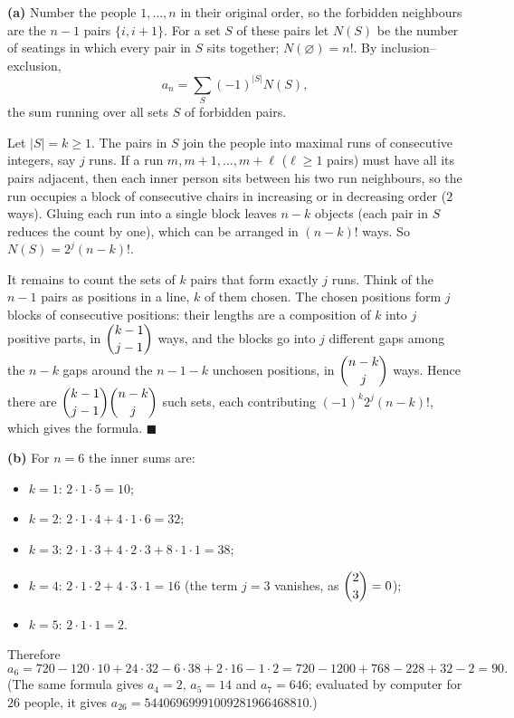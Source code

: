 \textbf{(a)} Number the people $1,\ldots,n$ in their original order, so the forbidden neighbours are the $n-1$ pairs $\{i,i+1\}$. For a set $S$ of these pairs let $N(S)$ be the number of seatings in which every pair in $S$ sits together; $N(\varnothing)=n!$. By inclusion--exclusion,
\[a_n=\sum_S(-1)^{|S|}N(S),\]
the sum running over all sets $S$ of forbidden pairs.

Let $|S|=k\ge1$. The pairs in $S$ join the people into maximal runs of consecutive integers, say $j$ runs. If a run $m,m+1,\ldots,m+\ell$ ($\ell\ge1$ pairs) must have all its pairs adjacent, then each inner person sits between his two run neighbours, so the run occupies a block of consecutive chairs in increasing or in decreasing order ($2$ ways). Gluing each run into a single block leaves $n-k$ objects (each pair in $S$ reduces the count by one), which can be arranged in $(n-k)!$ ways. So $N(S)=2^j(n-k)!$.

It remains to count the sets of $k$ pairs that form exactly $j$ runs. Think of the $n-1$ pairs as positions in a line, $k$ of them chosen. The chosen positions form $j$ blocks of consecutive positions: their lengths are a composition of $k$ into $j$ positive parts, in $\dbinom{k-1}{j-1}$ ways, and the blocks go into $j$ different gaps among the $n-k$ gaps around the $n-1-k$ unchosen positions, in $\dbinom{n-k}{j}$ ways. Hence there are $\dbinom{k-1}{j-1}\dbinom{n-k}{j}$ such sets, each contributing $(-1)^k2^j(n-k)!$, which gives the formula. $\blacksquare$

\textbf{(b)} For $n=6$ the inner sums are:
\begin{itemize}
\item $k=1$: $2\cdot1\cdot5=10$;
\item $k=2$: $2\cdot1\cdot4+4\cdot1\cdot6=32$;
\item $k=3$: $2\cdot1\cdot3+4\cdot2\cdot3+8\cdot1\cdot1=38$;
\item $k=4$: $2\cdot1\cdot2+4\cdot3\cdot1=16$ (the term $j=3$ vanishes, as $\dbinom23=0$);
\item $k=5$: $2\cdot1\cdot1=2$.
\end{itemize}
Therefore
\[a_6=720-120\cdot10+24\cdot32-6\cdot38+2\cdot16-1\cdot2=720-1200+768-228+32-2=\boxed{90}.\]
(The same formula gives $a_4=2$, $a_5=14$ and $a_7=646$; evaluated by computer for $26$ people, it gives $a_{26}=54406969991009281966468810$.)
